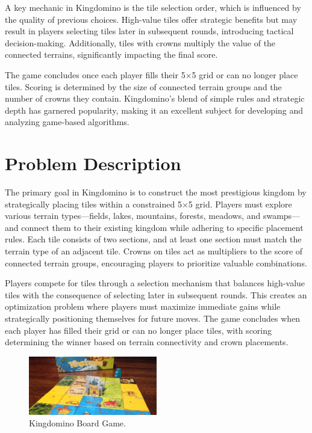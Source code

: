 \documentclass[conference]{IEEEtran}
\begin{document}
A key mechanic in Kingdomino is the tile selection order, which is influenced
by the quality of previous choices. High-value tiles offer strategic benefits
but may result in players selecting tiles later in subsequent rounds,
introducing tactical decision-making. Additionally, tiles with crowns multiply
the value of the connected terrains, significantly impacting the final score.

The game concludes once each player fills their 5$\times$5 grid or can no
longer place tiles. Scoring is determined by the size of connected terrain
groups and the number of crowns they contain. Kingdomino's blend of simple
rules and strategic depth has garnered popularity, making it an excellent
subject for developing and analyzing game-based algorithms.

\section{Problem Description}

The primary goal in Kingdomino is to construct the most prestigious kingdom by
strategically placing tiles within a constrained 5$\times$5 grid. Players must
explore various terrain types—fields, lakes, mountains, forests, meadows, and
swamps—and connect them to their existing kingdom while adhering to specific
placement rules. Each tile consists of two sections, and at least one section
must match the terrain type of an adjacent tile. Crowns on tiles act as
multipliers to the score of connected terrain groups, encouraging players to
prioritize valuable combinations.

Players compete for tiles through a selection mechanism that balances
high-value tiles with the consequence of selecting later in subsequent rounds.
This creates an optimization problem where players must maximize immediate
gains while strategically positioning themselves for future moves. The game
concludes when each player has filled their grid or can no longer place tiles,
with scoring determining the winner based on terrain connectivity and crown
placements.

\begin{figure}[htbp]
    \centerline{\includegraphics[width=0.5\textwidth]{assets/kingdomino.jpg}}
    \caption{Kingdomino Board Game.}\label{fig:kingdomino}
\end{figure}
\end{document}

